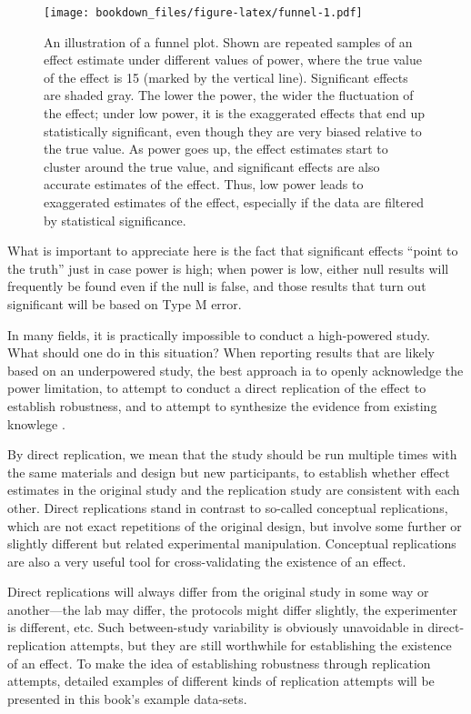 \documentclass[12pt,]{krantz}
\begin{document}
\begin{figure}
\centering
\texttt{[image: bookdown\_files/figure-latex/funnel-1.pdf]}
\caption{\label{fig:funnel}An illustration of a funnel plot. Shown are repeated samples of an effect estimate under different values of power, where the true value of the effect is 15 (marked by the vertical line). Significant effects are shaded gray. The lower the power, the wider the fluctuation of the effect; under low power, it is the exaggerated effects that end up statistically significant, even though they are very biased relative to the true value. As power goes up, the effect estimates start to cluster around the true value, and significant effects are also accurate estimates of the effect. Thus, low power leads to exaggerated estimates of the effect, especially if the data are filtered by statistical significance.}
\end{figure}

What is important to appreciate here is the fact that significant effects ``point to the truth'' just in case power is high; when power is low, either null results will frequently be found even if the null is false, and those results that turn out significant will be based on Type M error.

In many fields, it is practically impossible to conduct a high-powered study. What should one do in this situation? When reporting results that are likely based on an underpowered study, the best approach ia to openly acknowledge the power limitation, to attempt to conduct a direct replication of the effect to establish robustness, and to attempt to synthesize the evidence from existing knowlege \citep{cumming2014new}.

By direct replication, we mean that the study should be run multiple times with the same materials and design but new participants, to establish whether effect estimates in the original study and the replication study are consistent with each other. Direct replications stand in contrast to so-called conceptual replications, which are not exact repetitions of the original design, but involve some further or slightly different but related experimental manipulation. Conceptual replications are also a very useful tool for cross-validating the existence of an effect.

Direct replications will always differ from the original study in some way or another---the lab may differ, the protocols might differ slightly, the experimenter is different, etc. Such between-study variability is obviously unavoidable in direct-replication attempts, but they are still worthwhile for establishing the existence of an effect. To make the idea of establishing robustness through replication attempts, detailed examples of different kinds of replication attempts will be presented in this book's example data-sets.
\end{document}
